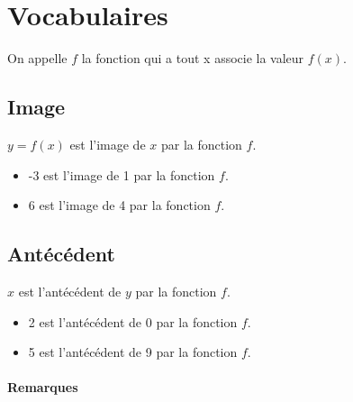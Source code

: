 \documentclass[paper=a4, fontsize=9pt]{scrartcl} %
\begin{document}
\section{Vocabulaires}

On appelle $f$ la fonction qui a tout x associe la valeur $f(x)$.
\begin{multicols}{2}

  \subsection{Image}

  \begin{Definition}
    $y = f(x)$ est l'image de $x$ par la fonction $f$.
  \end{Definition}
  \begin{itemize}
  \item -3 est l'image de 1 par la fonction $f$.\\
  \item 6 est l'image de 4 par la fonction $f$.
  \end{itemize}
  \subsection{Antécédent}

  \begin{Definition}
    $x$ est l'antécédent de $y$ par la fonction $f$.
  \end{Definition}

  \begin{itemize}
  \item 2 est l'antécédent de 0 par la fonction $f$.\\
  \item 5 est l'antécédent de 9 par la fonction $f$.
  \end{itemize}

\end{multicols}

\paragraph{Remarques}~~\\
\end{document}
